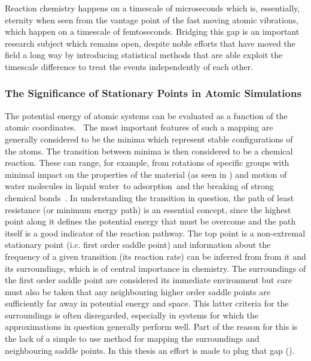 Reaction chemistry happens on a timescale of microseconds which is, essentially, eternity when seen from the vantage point of the fast moving atomic vibrations, which happen on a timescale of femtoseconds.
Bridging this gap is an important research subject which remains open, despite noble efforts that have moved the field a long way by introducing statistical methods that are able exploit the timescale difference to treat the events independently of each other.\cite{tst-eyring-1935, tst-polanyi-1935, tst-wigner-1938, htst-wert-1949, htst-vineyard-1957, tst-1990}

\subsubsection{The Significance of Stationary Points in Atomic Simulations}
The potential energy of atomic systems can be evaluated as a function of the atomic coordinates.~\cite{born-oppenheimer-1927, schrodinger-equation-1926, kohn-1999}
The most important features of such a mapping are generally considered to be the minima which represent stable configurations of the atoms.
The transition between minima is then considered to be a chemical reaction.
These can range, for example, from rotations of specific groups with minimal impact on the properties of the material (as seen in ) and motion of water molecules in liquid water~\citemiss to adsorption~\citemiss and the breaking of strong chemical bonds~\citemiss.
In understanding the transition in question, the path of least resistance (or minimum energy path) is an essential concept, since the highest point along it defines the potential energy that must be overcome and the path itself is a good indicator of the reaction pathway.
The top point is a non-extremal stationary point (i.c. first order saddle point) and information about the frequency of a given transition (its reaction rate) can be inferred from from it and its surroundings, which is of central importance in chemistry.\cite{htst-wert-1949, htst-vineyard-1957}
The surroundings of the first order saddle point are considered its immediate environment but care must also be taken that any neighbouring higher order saddle points are sufficiently far away in potential energy and space.
This latter criteria for the surroundings is often disregarded, especially in systems for which the approximations in question generally perform well.
Part of the reason for this is the lack of a simple to use method for mapping the surroundings and neighbouring saddle points.
In this thesis an effort is made to plug that gap ().

